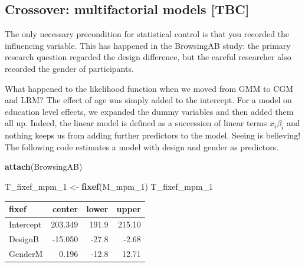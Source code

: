 \documentclass[]{svmono}
\newenvironment{Shaded}{\begin{snugshade}}{\end{snugshade}}
\newcommand{\KeywordTok}[1]{\textcolor[rgb]{0.13,0.29,0.53}{\textbf{#1}}}
\newcommand{\DataTypeTok}[1]{\textcolor[rgb]{0.13,0.29,0.53}{#1}}
\newcommand{\DecValTok}[1]{\textcolor[rgb]{0.00,0.00,0.81}{#1}}
\newcommand{\StringTok}[1]{\textcolor[rgb]{0.31,0.60,0.02}{#1}}
\newcommand{\OperatorTok}[1]{\textcolor[rgb]{0.81,0.36,0.00}{\textbf{#1}}}
\newcommand{\NormalTok}[1]{#1}
\begin{document}
\subsection{Crossover: multifactorial models
{[}TBC{]}}\label{crossover-multifactorial-models-tbc}

The only necessary precondition for statistical control is that you
recorded the influencing variable. This has happened in the BrowsingAB
study: the primary research question regarded the design difference, but
the careful researcher also recorded the gender of participants.

What happened to the likelihood function when we moved from GMM to CGM
and LRM? The effect of age was simply added to the intercept. For a
model on education level effects, we expanded the dummy variables and
then added them all up. Indeed, the linear model is defined as a
succession of linear terms \(x_i\beta_i\) and nothing keeps us from
adding further predictors to the model. Seeing is believing! The
following code estimates a model with design and gender as predictors.

\begin{Shaded}
\begin{Highlighting}[]
\KeywordTok{attach}\NormalTok{(BrowsingAB)}
\end{Highlighting}
\end{Shaded}

\begin{Shaded}
\end{Shaded}

\begin{Shaded}
\begin{Highlighting}[]
\NormalTok{T_fixef_mpm_}\DecValTok{1}\NormalTok{ <-}\StringTok{ }\KeywordTok{fixef}\NormalTok{(M_mpm_}\DecValTok{1}\NormalTok{)}
\NormalTok{T_fixef_mpm_}\DecValTok{1}
\end{Highlighting}
\end{Shaded}

\begin{longtable}[]{@{}lrrr@{}}
\toprule
fixef & center & lower & upper\tabularnewline
\midrule
\endhead
Intercept & 203.349 & 191.9 & 215.10\tabularnewline
DesignB & -15.050 & -27.8 & -2.68\tabularnewline
GenderM & 0.196 & -12.8 & 12.71\tabularnewline
\bottomrule
\end{longtable}
\end{document}
